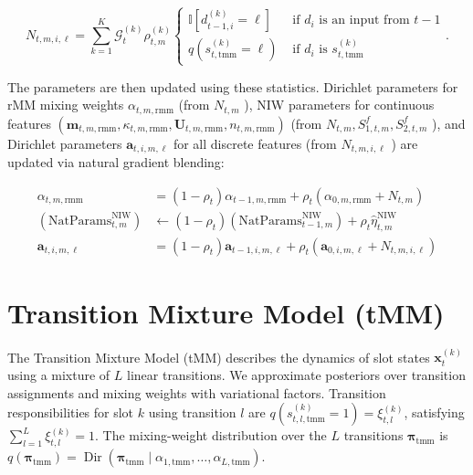 \documentclass[10pt]{article}
\begin{document}
\[
N_{t, m, i, \ell}=\sum_{k=1}^{K} \mathcal{G}_{t}^{(k)} \rho_{t, m}^{(k)}\left\{\begin{array}{ll}
\mathbb{I}\left[d_{t-1, i}^{(k)}=\ell\right] & \text { if } d_{i} \text { is an input from } t-1  \tag{55}\\
q\left(s_{t, \mathrm{tmm}}^{(k)}=\ell\right) & \text { if } d_{i} \text { is } s_{t, \mathrm{tmm}}^{(k)}
\end{array} .\right.
\]

The parameters are then updated using these statistics. Dirichlet parameters for rMM mixing weights $\alpha_{t, m, \mathrm{rmm}}$ (from $N_{t, m}$ ), NIW parameters for continuous features $\left(\mathbf{m}_{t, m, \mathrm{rmm}}, \kappa_{t, m, \mathrm{rmm}}, \mathbf{U}_{t, m, \mathrm{rmm}}, n_{t, m, \mathrm{rmm}}\right)$ (from $N_{t, m}, S_{1, t, m}^{f}, S_{2, t, m}^{f}$ ), and Dirichlet parameters $\mathbf{a}_{t, i, m, \ell}$ for all discrete features (from $N_{t, m, i, \ell}$ ) are updated via natural gradient blending:


\begin{align*}
\alpha_{t, m, \mathrm{rmm}} & =\left(1-\rho_{t}\right) \alpha_{t-1, m, \mathrm{rmm}}+\rho_{t}\left(\alpha_{0, m, \mathrm{rmm}}+N_{t, m}\right) \\
\left(\mathrm{NatParams}_{t, m}^{\mathrm{NIW}}\right) & \leftarrow\left(1-\rho_{t}\right)\left(\mathrm{NatParams}_{t-1, m}^{\mathrm{NIW}}\right)+\rho_{t} \widehat{\eta}_{t, m}^{\mathrm{NIW}}  \tag{56}\\
\mathbf{a}_{t, i, m, \ell} & =\left(1-\rho_{t}\right) \mathbf{a}_{t-1, i, m, \ell}+\rho_{t}\left(\mathbf{a}_{0, i, m, \ell}+N_{t, m, i, \ell}\right)
\end{align*}


\section*{Transition Mixture Model (tMM)}
The Transition Mixture Model (tMM) describes the dynamics of slot states $\mathbf{x}_{t}^{(k)}$ using a mixture of $L$ linear transitions. We approximate posteriors over transition assignments and mixing weights with variational factors. Transition responsibilities for slot $k$ using transition $l$ are $q\left(s_{t, l, \mathrm{tmm}}^{(k)}=1\right)=\xi_{t, l}^{(k)}$, satisfying $\sum_{l=1}^{L} \xi_{t, l}^{(k)}=1$. The mixing-weight distribution over the $L$ transitions $\boldsymbol{\pi}_{\mathrm{tmm}}$ is $q\left(\boldsymbol{\pi}_{\mathrm{tmm}}\right)= \operatorname{Dir}\left(\boldsymbol{\pi}_{\mathrm{tmm}} \mid \alpha_{1, \mathrm{tmm}}, \ldots, \alpha_{L, \mathrm{tmm}}\right)$.
\end{document}
